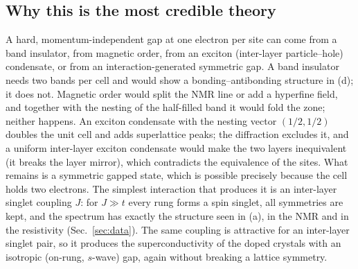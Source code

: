 \documentclass[11pt]{article}
\begin{document}
\subsection{Why this is the most credible theory}
A hard, momentum-independent gap at one electron per site can come from a band insulator, from magnetic order, from an exciton (inter-layer particle--hole) condensate, or from an interaction-generated symmetric gap. A band insulator needs two bands per cell and would show a bonding--antibonding structure in (d); it does not. Magnetic order would split the NMR line or add a hyperfine field, and together with the nesting of the half-filled band it would fold the zone; neither happens. An exciton condensate with the nesting vector $(1/2,1/2)$ doubles the unit cell and adds superlattice peaks; the diffraction excludes it, and a uniform inter-layer exciton condensate would make the two layers inequivalent (it breaks the layer mirror), which contradicts the equivalence of the sites. What remains is a symmetric gapped state, which is possible precisely because the cell holds two electrons. The simplest interaction that produces it is an inter-layer singlet coupling $J$: for $J\gg t$ every rung forms a spin singlet, all symmetries are kept, and the spectrum has exactly the structure seen in (a), in the NMR and in the resistivity (Sec.~\ref{sec:data}). The same coupling is attractive for an inter-layer singlet pair, so it produces the superconductivity of the doped crystals with an isotropic (on-rung, $s$-wave) gap, again without breaking a lattice symmetry.
\end{document}
